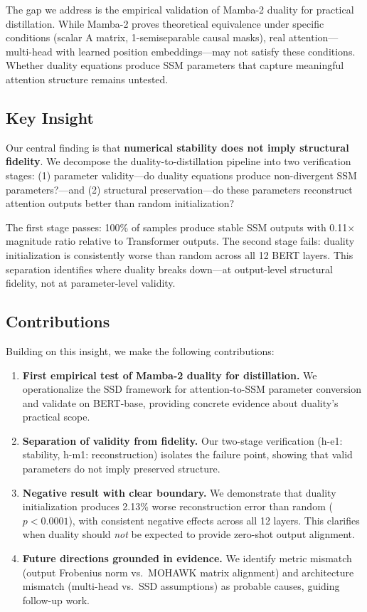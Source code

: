 The gap we address is the empirical validation of Mamba-2 duality for practical distillation. While Mamba-2 proves theoretical equivalence under specific conditions (scalar A matrix, 1-semiseparable causal masks), real attention---multi-head with learned position embeddings---may not satisfy these conditions. Whether duality equations produce SSM parameters that capture meaningful attention structure remains untested.

\subsection{Key Insight}

Our central finding is that \textbf{numerical stability does not imply structural fidelity}. We decompose the duality-to-distillation pipeline into two verification stages: (1) parameter validity---do duality equations produce non-divergent SSM parameters?---and (2) structural preservation---do these parameters reconstruct attention outputs better than random initialization?

The first stage passes: 100\% of samples produce stable SSM outputs with 0.11$\times$ magnitude ratio relative to Transformer outputs. The second stage fails: duality initialization is consistently worse than random across all 12 BERT layers. This separation identifies where duality breaks down---at output-level structural fidelity, not at parameter-level validity.

\subsection{Contributions}

Building on this insight, we make the following contributions:

\begin{enumerate}
    \item \textbf{First empirical test of Mamba-2 duality for distillation.} We operationalize the SSD framework for attention-to-SSM parameter conversion and validate on BERT-base, providing concrete evidence about duality's practical scope.

    \item \textbf{Separation of validity from fidelity.} Our two-stage verification (h-e1: stability, h-m1: reconstruction) isolates the failure point, showing that valid parameters do not imply preserved structure.

    \item \textbf{Negative result with clear boundary.} We demonstrate that duality initialization produces 2.13\% worse reconstruction error than random ($p < 0.0001$), with consistent negative effects across all 12 layers. This clarifies when duality should \emph{not} be expected to provide zero-shot output alignment.

    \item \textbf{Future directions grounded in evidence.} We identify metric mismatch (output Frobenius norm vs.\ MOHAWK matrix alignment) and architecture mismatch (multi-head vs.\ SSD assumptions) as probable causes, guiding follow-up work.
\end{enumerate}
